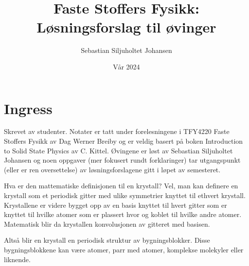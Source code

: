 \documentclass{article}
\title{Faste Stoffers Fysikk: Løsningsforslag til øvinger}
\author{Sebastian Siljuholtet Johansen}
\date{Vår 2024}
\begin{document}
\maketitle

\newpage
\section*{Ingress}
Skrevet av studenter. Notater er tatt under forelesningene i TFY4220 Faste Stoffers Fysikk av Dag Werner Breiby og er veldig basert på boken Introduction to Solid State Physics av C. Kittel. Øvingene er løst av Sebastian Siljuholtet Johansen og noen oppgaver (mer fokusert rundt forklaringer) tar utgangspunkt (eller er ren oversettelse) av løsningsforslagene gitt i løpet av semesteret.

\newpage
\tableofcontents

\newpage
{}
Hva er den mattematiske definisjonen til en krystall? Vel, man kan definere en krystall som et periodisk gitter med ulike symmetrier knyttet til ethvert krystall. Krystallene er videre bygget opp av en basis knyttet til hvert gitter som er knyttet til hvilke atomer som er plassert hvor og koblet til hvilke andre atomer. Matematisk blir da krystallen konvolusjonen av gitteret med basisen.

Altså blir en krystall en periodisk struktur av bygningsblokker. Disse bygningsblokkene kan være atomer, parr med atomer, komplekse molekyler eller liknende.
\end{document}
